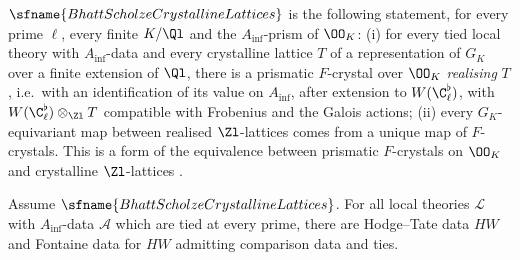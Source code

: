 \begin{definition}\label{pf:sh-hodge:def-bs}
$\sfname{BhattScholzeCrystallineLattices}$ is the following statement, for every prime $\ell$, every finite $K/\Ql$ and the
$A_{\inf}$-prism of $\OO_K$: (i) for every tied local theory with $A_{\inf}$-data and every crystalline lattice $T$ of a representation of
$G_K$ over a finite extension of $\Ql$, there is a prismatic $F$-crystal over $\OO_K$ \emph{realising} $T$, i.e.\ with an identification of
its value on $A_{\inf}$, after extension to $W(\C_\ell^\flat)$, with $W(\C_\ell^\flat)\otimes_{\Zl}T$ compatible with Frobenius and the Galois
actions; (ii) every $G_K$-equivariant map between realised $\Zl$-lattices comes from a unique map of $F$-crystals. This is a form of the
equivalence between prismatic $F$-crystals on $\OO_K$ and crystalline $\Zl$-lattices \cite[Thm.~1.2 and \S5]{BhattScholze2023}.
\end{definition}

\begin{theorem}\label{pf:sh-hodge:exhw}
Assume $\sfname{BhattScholzeCrystallineLattices}$. For all local theories $\mathcal L$ with $A_{\inf}$-data $\mathcal A$ which are tied at every
prime, there are Hodge--Tate data $HW$ and Fontaine data for $HW$ admitting comparison data and ties.
\end{theorem}

